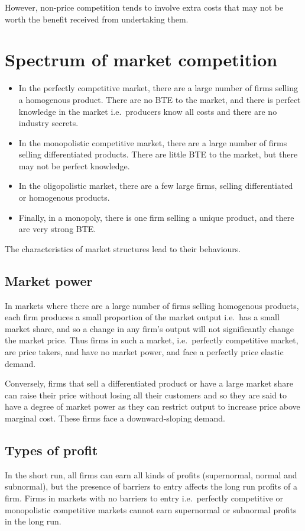 \documentclass[Economics.tex]{subfiles}
\begin{document}
However, non-price competition tends to involve extra costs that may not be worth the benefit received from undertaking them.
\section{Spectrum of market competition}
\begin{itemize}
\item In the perfectly competitive market, there are a large number of firms selling a homogenous product. There are no BTE to the market, and there is perfect knowledge in the market i.e.\ producers know all costs and there are no industry secrets.
\item In the monopolistic competitive market, there are a large number of firms selling differentiated products. There are little BTE to the market, but there may not be perfect knowledge.
\item In the oligopolistic market, there are a few large firms, selling differentiated or homogenous products.
\item Finally, in a monopoly, there is one firm selling a unique product, and there are very strong BTE.
\end{itemize}

The characteristics of market structures lead to their behaviours.
\subsection{Market power}
In markets where there are a large number of firms selling homogenous products, each firm produces a small proportion of the market output i.e.\ has a small market share, and so a change in any firm's output will not significantly change the market price. Thus firms in such a market, i.e.\ perfectly competitive market, are price takers, and have no market power, and face a perfectly price elastic demand.

Conversely, firms that sell a differentiated product or have a large market share can raise their price without losing all their customers and so they are said to have a degree of market power as they can restrict output to increase price above marginal cost. These firms face a downward-sloping demand.
\subsection{Types of profit}
In the short run, all firms can earn all kinds of profits (supernormal, normal and subnormal), but the presence of barriers to entry affects the long run profits of a firm. Firms in markets with no barriers to entry i.e.\ perfectly competitive or monopolistic competitive markets cannot earn supernormal or subnormal profits in the long run.
\end{document}
